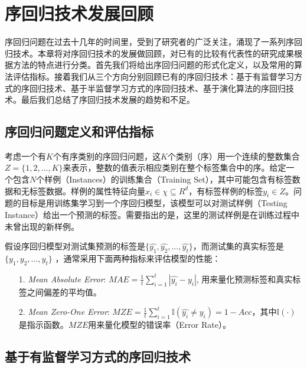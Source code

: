 \chapter{序回归技术发展回顾}
\label{chap:review}

序回归问题在过去十几年的时间里，受到了研究者的广泛关注，涌现了一系列序回归技术。本章将对序回归技术的发展做回顾，对已有的比较有代表性的研究成果根据方法的特点进行分类。首先我们将给出序回归问题的形式化定义，以及常用的算法评估指标。接着我们从三个方向分别回顾已有的序回归技术：基于有监督学习方式的序回归技术、基于半监督学习方式的序回归技术、基于演化算法的序回归技术。最后我们总结了序回归技术发展的趋势和不足。

\section{序回归问题定义和评估指标}
考虑一个有\(K\)个有序类别的序回归问题，这\(K\)个类别（序）用一个连续的整数集合 \(Z=\{1,2,\dots,K\}\)来表示，整数的值表示相应类别在整个标签集合中的序。给定一个包含\(N\)个样例（Instances）的训练集合（Training Set），其中可能包含有标签数据和无标签数据。样例的属性特征向量\(x_{i} \in \chi \subseteq R^{d}\)，有标签样例的标签\(y_{i} \in Z\)。问题的目标是用训练集学习到一个序回归模型，该模型可以对测试样例（Testing Instance）给出一个预测的标签。需要指出的是，这里的测试样例是在训练过程中未曾出现的新样例。


假设序回归模型对测试集预测的标签是\(\{\hat{y_{1}},\hat{y_{2}},\dots,\hat{y_{t}}\}\)，而测试集的真实标签是 \(\{y_{1},y_{2},\dots,y_{t}\}\) ，通常采用下面两种指标来评估模型的性能：
\begin{enumerate}
\item[1.] \textit{Mean Absolute Error}: \(MAE=\frac{1}{t}\sum_{i=1}^{t}|\hat{y_{i}}-y_{i}|\), 用来量化预测标签和真实标签之间偏差的平均值。
\item[2.] \textit{Mean Zero-One Error}: \(MZE=\frac{1}{t}\sum_{i=1}^{t}\mathbb{I}(\hat{y_{i}}\neq y_{i}) = 1-Acc\)，其中\(\mathbb{I}(\cdot)\)是指示函数。\(MZE\)用来量化模型的错误率（Error Rate）。
\end{enumerate}

\section{基于有监督学习方式的序回归技术}

